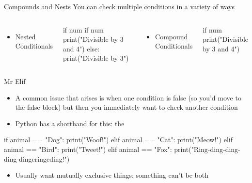 \documentclass[pdf, aspectratio=169, 12pt]{beamer}
\begin{document}
\begin{frame}[fragile]{Compounds and Nests}
	You can check multiple conditions in a variety of ways
	\begin{columns}[t]
		\begin{itemize}
			\item Nested Conditionals
		\end{itemize}
		\begin{pythoncode}[tabsize=2]
			if num%
				if num%
					print("Divisible by 3 and 4")
				else:
					print("Divisible by 3")
		\end{pythoncode}
		\begin{itemize}
			\item Compound Conditionals
		\end{itemize}
		\begin{pythoncode}
			if num%
				print("Divisible by 3 and 4")
		\end{pythoncode}
	\end{columns}
\end{frame}

\begin{frame}[fragile]{Mr Elif}
	\vspace{5mm}
	\begin{itemize}
		\item A common issue that arises is when one condition is false (so you'd move to the false block) but then you immediately want to check another condition
		\item Python has a shorthand for this: the 
	\end{itemize}
	\begin{pythoncode}
		if animal == "Dog":
			print("Woof!")
		elif animal == "Cat":
			print("Meow!")
		elif animal == "Bird":
			print("Tweet!")
		elif animal == "Fox":
			print("Ring-ding-ding-ding-dingeringeding!")
	\end{pythoncode}
	\begin{itemize}
		\item Usually want mutually exclusive things: something can't be both
	\end{itemize}
\end{frame}
\end{document}
